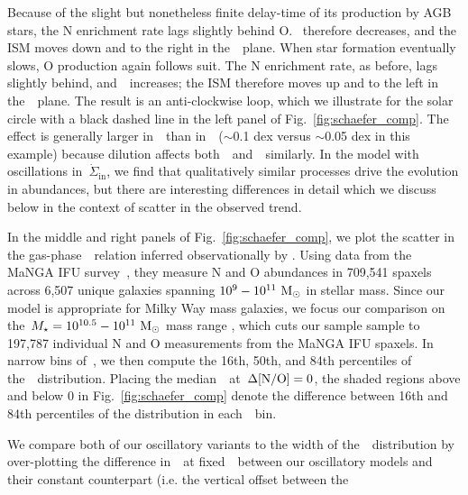 \documentclass[ms.tex]{subfiles}
\begin{document}
Because of the slight but nonetheless finite delay-time of its production by
AGB stars, the N enrichment rate lags slightly behind O.
\no~therefore decreases, and the ISM moves down and to the right in
the~\ohno~plane.
When star formation eventually slows, O production again follows suit.
The N enrichment rate, as before, lags slightly behind, and~\no~increases; the
ISM therefore moves up and to the left in the~\ohno~plane.
The result is an anti-clockwise loop, which we illustrate for the solar circle
with a black dashed line in the left panel of Fig.~\ref{fig:schaefer_comp}.
The effect is generally larger in~\oh~than in~\no~($\sim$0.1 dex versus
$\sim$0.05 dex in this example) because dilution affects
both~\oh~and~\nh~similarly.
In the model with oscillations in~$\dot{\Sigma}_\text{in}$, we find that
qualitatively similar processes drive the evolution in abundances, but there
are interesting differences in detail which we discuss below in the context of
scatter in the observed trend.
\par
In the middle and right panels of Fig.~\ref{fig:schaefer_comp}, we plot the
scatter in the gas-phase~\ohno~relation inferred observationally by
\citet{Schaefer2020}.
Using data from the MaNGA IFU survey~\citep{Bundy2015}, they measure N and O
abundances in 709,541 spaxels across 6,507 unique galaxies spanning
$10^9 - 10^{11}~\text{M}_\odot$ in stellar mass.
Since our model is appropriate for Milky Way mass galaxies, we focus our
comparison on the~$M_\star = 10^{10.5} - 10^{11}~\text{M}_\odot$ mass range
\citep{Licquia2015}, which cuts our sample sample to 197,787 individual N and O
measurements from the MaNGA IFU spaxels.
In narrow bins of~\oh, we then compute the 16th, 50th, and 84th percentiles of
the~\no~distribution.
Placing the median~\no~at~$\Delta\text{[N/O]} = 0$, the shaded regions above and below
0 in Fig.~\ref{fig:schaefer_comp} denote the difference between 16th and 84th
percentiles of the distribution in each~\oh~bin.
\par
We compare both of our oscillatory variants to the width of the~\no~distribution
by over-plotting the difference in~\no~at fixed~\oh~between our oscillatory
models and their constant counterpart (i.e. the vertical offset between the
\end{document}
